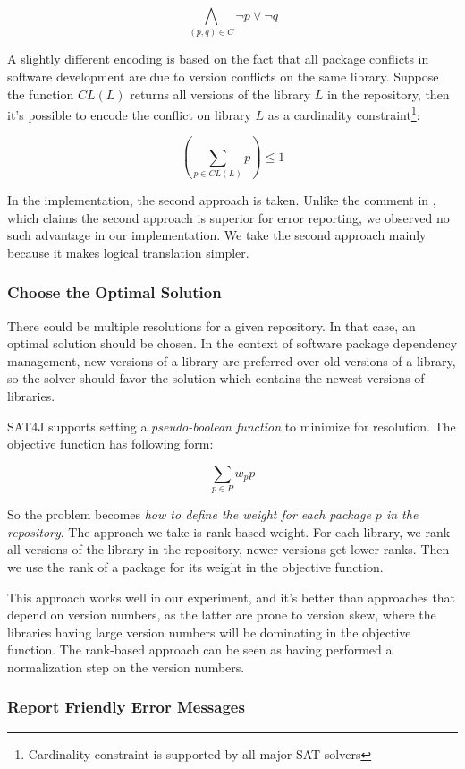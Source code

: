 \[
\bigwedge_{(p, q) \in C} \neg p \vee \neg q
\]

A slightly different encoding is based on the fact that all package conflicts in software development are due to version conflicts on the same library. Suppose the function $CL(L)$ returns all versions of the library $L$ in the repository, then it's possible to encode the conflict on library $L$ as a cardinality constraint\footnote{Cardinality constraint is supported by all major SAT solvers}:

\[
(\sum_{p \in CL(L)} p) \leq 1
\]

In the implementation, the second approach is taken. Unlike the comment in \cite{berre2009dependency}, which claims the second approach is superior for error reporting, we observed no such advantage in our implementation. We take the second approach mainly because it makes logical translation simpler.

\subsubsection{Choose the Optimal Solution}

There could be multiple resolutions for a given repository. In that case, an optimal solution should be chosen. In the context of software package dependency management, new versions of a library are preferred over old versions of a library, so the solver should favor the solution which contains the newest versions of libraries.

SAT4J supports setting a \emph{pseudo-boolean function} to minimize for resolution. The objective function has following form:

\[
\sum_{p \in P} w_p p
\]

So the problem becomes \emph{how to define the weight for each package $p$ in the repository}. The approach we take is rank-based weight. For each library, we rank all versions of the library in the repository, newer versions get lower ranks. Then we use the rank of a package for its weight in the objective function.

This approach works well in our experiment, and it's better than approaches that depend on version numbers, as the latter are prone to version skew, where the libraries having large version numbers will be dominating in the objective function. The rank-based approach can be seen as having performed a normalization step on the version numbers.

\subsubsection{Report Friendly Error Messages}

